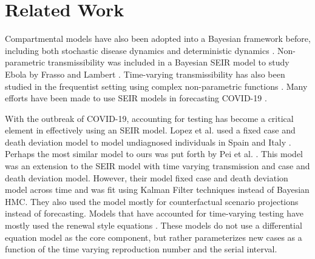 \documentclass[11pt]{amsart}
\begin{document}
\section{Related Work}


Compartmental models have also been adopted into a Bayesian framework before, including both stochastic disease dynamics and deterministic dynamics \cite{hotta2010bayesian}\cite{dukic2012tracking}. Non-parametric transmissibility was included in a Bayesian SEIR model to study Ebola by Frasso and Lambert \cite{frasso2016bayesian}. Time-varying transmissibility has also been studied in the frequentist setting using complex non-parametric functions \cite{smirnova2019forecasting}. Many efforts have been made to use SEIR models in forecasting COVID-19 \cite{giordano2020modelling}\cite{yang2020modified} \cite{bertozzi2020challenges}\cite{prem2020effect}\cite{flaxman2020estimating}.

With the outbreak of COVID-19, accounting for testing has become a critical element in effectively using an SEIR model. Lopez et al. used a fixed case and death deviation model to model undiagnosed individuals in Spain and Italy \cite{lopez2020modified}.  Perhaps the most similar model to ours was put forth by Pei et al. \cite{pei2020differential}. This model was an extension to the SEIR model with time varying transmission and case and death deviation model. However, their model fixed case and death deviation model across time and was fit using Kalman Filter techniques instead of Bayesian HMC. They also used the model mostly for counterfactual scenario projections instead of forecasting. Models that have accounted for time-varying testing have mostly used the renewal style equations \cite{abbott2020estimating}\cite{flaxman2020estimating}. These models do not use a differential equation model as the core component, but rather parameterizes new cases as a function of the time varying reproduction number and the serial interval. 
\end{document}
